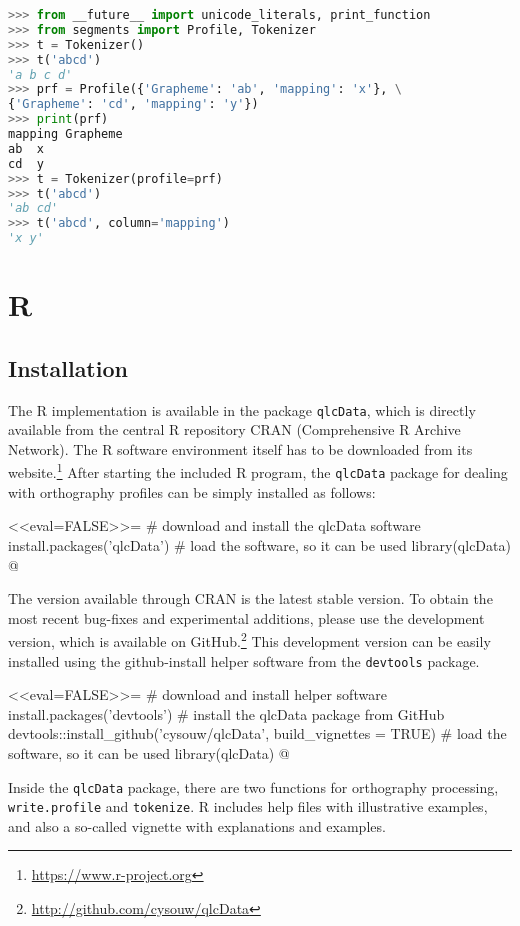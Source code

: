 \begin{lstlisting}[language=python]
>>> from __future__ import unicode_literals, print_function
>>> from segments import Profile, Tokenizer
>>> t = Tokenizer()
>>> t('abcd')
'a b c d'
>>> prf = Profile({'Grapheme': 'ab', 'mapping': 'x'}, \
{'Grapheme': 'cd', 'mapping': 'y'})
>>> print(prf)
mapping Grapheme
ab  x
cd  y
>>> t = Tokenizer(profile=prf)
>>> t('abcd')
'ab cd'
>>> t('abcd', column='mapping')
'x y'
\end{lstlisting}


\section{R}
\label{r-implementation}

\subsection*{Installation}

The R implementation is available in the package \texttt{qlcData}, which is 
directly available from the central R repository CRAN (Comprehensive R Archive 
Network). The R software environment itself has to be downloaded from its 
website.\footnote{\url{https://www.r-project.org}} After starting the included 
R program, the \texttt{qlcData} package for dealing with orthography profiles can be 
simply installed as follows:

<<eval=FALSE>>=
# download and install the qlcData software
install.packages('qlcData') 
# load the software, so it can be used
library(qlcData) 
@

The version available through CRAN is the latest stable version.
To obtain the most recent bug-fixes and experimental additions, please use the
development version, which is available on
GitHub.\footnote{\url{http://github.com/cysouw/qlcData}} This development
version can be easily installed using the github-install helper software from the
\texttt{devtools} package.

<<eval=FALSE>>=
# download and install helper software
install.packages('devtools') 
# install the qlcData package from GitHub
devtools::install_github('cysouw/qlcData', build_vignettes = TRUE)
# load the software, so it can be used 
library(qlcData) 
@

Inside the \texttt{qlcData} package, there are two functions for
orthography processing, \texttt{write.profile} and \texttt{tokenize}. R includes
help files with illustrative examples, and also a so-called vignette with
explanations and examples.

